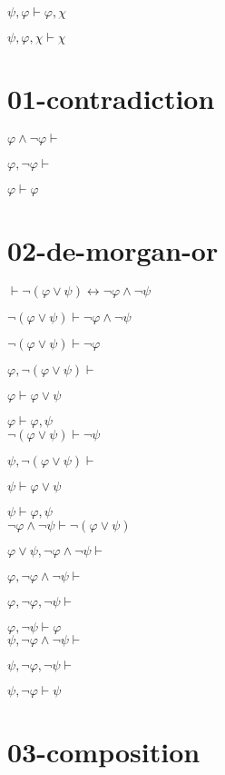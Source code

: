 \documentclass[a4paper,12pt]{article}
\begin{document}
$\psi, \varphi \vdash \varphi, \chi$


$\psi, \varphi, \chi \vdash \chi$

\section*{01-contradiction}

$\varphi \land \neg \varphi \vdash$

$\varphi, \neg \varphi \vdash$

$\varphi \vdash \varphi$

\section*{02-de-morgan-or}

$\vdash \neg(\varphi \lor \psi) \leftrightarrow \neg \varphi \land \neg \psi$

$\neg(\varphi \lor \psi) \vdash \neg \varphi \land \neg \psi$

$\neg(\varphi \lor \psi) \vdash \neg \varphi$

$\varphi, \neg(\varphi \lor \psi) \vdash$

$\varphi \vdash \varphi \lor \psi$

$\varphi \vdash \varphi, \psi$  \\


$\neg(\varphi \lor \psi) \vdash \neg \psi$

$\psi, \neg(\varphi \lor \psi) \vdash$

$\psi \vdash \varphi \lor \psi$

$\psi \vdash \varphi, \psi$ \\


$\neg \varphi \land \neg \psi \vdash \neg(\varphi \lor \psi)$

$\varphi \lor \psi, \neg \varphi \land \neg \psi \vdash$

$\varphi, \neg \varphi \land \neg \psi \vdash$

$\varphi, \neg \varphi, \neg \psi \vdash$

$\varphi, \neg \psi \vdash \varphi$ \\


$\psi, \neg \varphi \land \neg \psi \vdash$

$\psi, \neg \varphi, \neg \psi \vdash$

$\psi, \neg \varphi \vdash \psi$

\section*{03-composition}
\end{document}
